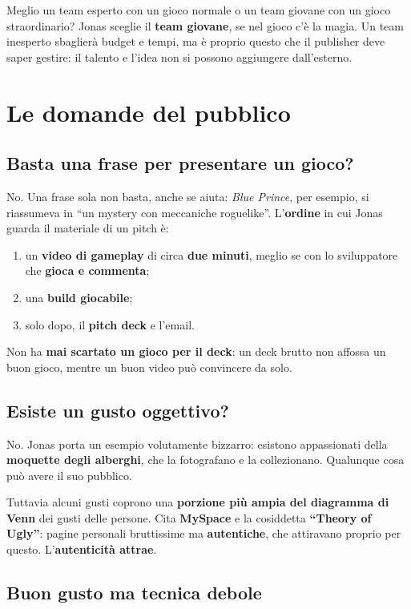 Meglio un team esperto con un gioco normale o un team giovane con un gioco
straordinario? Jonas sceglie il \textbf{team giovane}, se nel gioco c'è la magia.
Un team inesperto sbaglierà budget e tempi, ma è proprio questo che il publisher
deve saper gestire: il talento e l'idea non si possono aggiungere dall'esterno.

\section{Le domande del pubblico}
\label{sec:c2-5-domande}

\subsection{Basta una frase per presentare un gioco?}

No. Una frase sola non basta, anche se aiuta: \emph{Blue Prince}, per esempio, si
riassumeva in ``un mystery con meccaniche roguelike''. L'\textbf{ordine} in cui
Jonas guarda il materiale di un pitch è:
\begin{enumerate}
  \item un \textbf{video di gameplay} di circa \textbf{due minuti}, meglio se con
        lo sviluppatore che \textbf{gioca e commenta};
  \item una \textbf{build giocabile};
  \item solo dopo, il \textbf{pitch deck} e l'email.
\end{enumerate}
Non ha \textbf{mai scartato un gioco per il deck}: un deck brutto non affossa un
buon gioco, mentre un buon video può convincere da solo.

\subsection{Esiste un gusto oggettivo?}

No. Jonas porta un esempio volutamente bizzarro: esistono appassionati della
\textbf{moquette degli alberghi}, che la fotografano e la collezionano. Qualunque
cosa può avere il suo pubblico.

Tuttavia alcuni gusti coprono una \textbf{porzione più ampia del diagramma di
Venn} dei gusti delle persone. Cita \textbf{MySpace} e la cosiddetta
\textbf{``Theory of Ugly''}: pagine personali bruttissime ma
\textbf{autentiche}, che attiravano proprio per questo. L'\textbf{autenticità
attrae}.

\subsection{Buon gusto ma tecnica debole}

